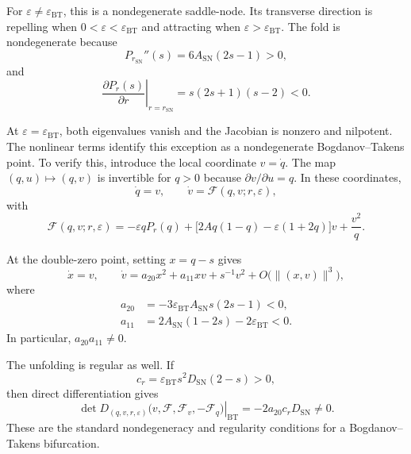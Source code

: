 \documentclass[11pt,reqno]{amsart}
\theoremstyle{plain}
\theoremstyle{definition}
\theoremstyle{remark}
\begin{document}
For $\varepsilon\neq\varepsilon_{\mathrm{BT}}$, this is a
nondegenerate saddle-node. Its transverse direction is repelling
when $0<\varepsilon<\varepsilon_{\mathrm{BT}}$ and attracting
when $\varepsilon>\varepsilon_{\mathrm{BT}}$.
The fold is nondegenerate because
\[
P_{r_{\mathrm{SN}}}''(s)
=
6A_{\mathrm{SN}}(2s-1)>0,
\]
and
\[
\left.
\frac{\partial P_r(s)}{\partial r}
\right|_{r=r_{\mathrm{SN}}}
=
s(2s+1)(s-2)<0.
\]

At $\varepsilon=\varepsilon_{\mathrm{BT}}$, both eigenvalues
vanish and the Jacobian is nonzero and nilpotent.
The nonlinear terms identify this exception as a nondegenerate
Bogdanov--Takens point. To verify this, introduce the local
coordinate $v=\dot q$. The map $(q,u)\mapsto(q,v)$ is invertible
for $q>0$ because $\partial v/\partial u=q$. In these coordinates,
\begin{equation}
\dot q=v,
\qquad
\dot v=\mathcal F(q,v;r,\varepsilon),
\label{eq:bl-local-second-order}
\end{equation}
with
\begin{equation}
\mathcal F(q,v;r,\varepsilon)
=
-\varepsilon qP_r(q)
+
\bigl[
2Aq(1-q)-\varepsilon(1+2q)
\bigr]v
+
\frac{v^2}{q}.
\label{eq:bl-local-F}
\end{equation}

At the double-zero point, setting $x=q-s$ gives
\[
\dot x=v,
\qquad
\dot v
=
a_{20}x^2+a_{11}xv+s^{-1}v^2
+
O\bigl(\|(x,v)\|^3\bigr),
\]
where
\begin{equation}
\begin{aligned}
a_{20}
&=
-3\varepsilon_{\mathrm{BT}}
A_{\mathrm{SN}}s(2s-1)<0,
\\
a_{11}
&=
2A_{\mathrm{SN}}(1-2s)
-
2\varepsilon_{\mathrm{BT}}<0.
\end{aligned}
\label{eq:bl-BT-coefficients}
\end{equation}
In particular, $a_{20}a_{11}\neq0$.

The unfolding is regular as well. If
\[
c_r
=
\varepsilon_{\mathrm{BT}}
s^2D_{\mathrm{SN}}(2-s)>0,
\]
then direct differentiation gives
\begin{equation}
\left.
\det D_{(q,v,r,\varepsilon)}
\bigl(
v,\mathcal F,\mathcal F_v,-\mathcal F_q
\bigr)
\right|_{\mathrm{BT}}
=
-2a_{20}c_rD_{\mathrm{SN}}
\neq0.
\label{eq:bl-BT-regularity}
\end{equation}
These are the standard nondegeneracy and regularity conditions
for a Bogdanov--Takens bifurcation.
\end{document}
